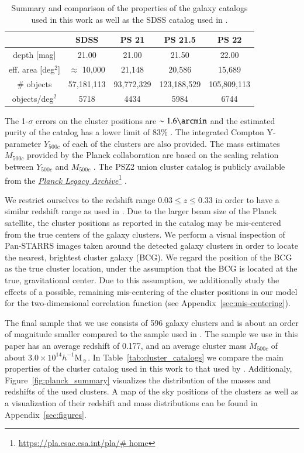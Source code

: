 \documentclass[iop, apjl, twocolappendix, numberedappendix]{emulateapj}
\newcommand\fnurl[2]{%
  \href{#2}{#1}\footnote{\url{#2}}%
}
\begin{document}
\begin{table}
    \centering
    \caption{Summary and comparison of the properties of the galaxy catalogs used in this work as well as the SDSS catalog used in \citet{more2016detection}.}
    \label{tab:galaxy_catalogs}
    \begin{tabular}{ccccc}
    \hline
    & SDSS & PS 21 & PS 21.5 & PS 22 \\
    \hline
    depth [mag] & 21.00 & 21.00 & 21.50 & 22.00\\
    \hline
    eff. area [deg$^2$] & $\approx$ 10,000 & 21,148 & 20,586 & 15,689\\
    \hline
    \# objects & 57,181,113 & 93,772,329 & 123,188,529 & 105,809,113 \\
    \hline
    objects/deg$^2$ & 5718 & 4434 & 5984 & 6744\\
    \hline
    \end{tabular}
\end{table}


The 1-$\sigma$ errors on the cluster positions are $\sim1.6\arcmin$
and the estimated purity of the catalog has a lower limit of 83\%
\citep{ade2016psclusters}. The integrated Compton Y-parameter
$Y_{500c}$ of each of the clusters are also provided. The mass
estimates $M_{500c}$ provided by the Planck collaboration are based on
the scaling relation between $Y_{500c}$ and $M_{500c}$
\citep{ade2014planck,adam2016planck,collaboration2016planck}. The PSZ2
union cluster catalog is publicly available from the
\fnurl{\textit{Planck Legacy Archive}}{https://pla.esac.esa.int/pla/\#
home}.

We restrict ourselves to the redshift range $0.03 \leq z \leq 0.33$ in
order to have a similar redshift range as used in \citet{more2016detection}.
Due to the larger beam size of the Planck
satellite, the cluster positions as reported in the catalog may be
mis-centered from the true centers of the galaxy clusters. We perform
a visual inspection of Pan-STARRS images taken around the detected
galaxy clusters in order to locate the nearest, brightest cluster
galaxy (BCG). We regard the position of the BCG as the true cluster
location, under the assumption that the BCG is located at the true,
gravitational center. Due to this assumption, we additionally
study the effects of a possible, remaining mis-centering of the
cluster positions in our model for the two-dimensional correlation
function (see Appendix~\ref{sec:mis-centering}).

The final sample that we use consists of 596
galaxy clusters and is about an order of magnitude smaller compared
to the sample used in \citet{more2016detection}. The sample we use
in this paper has an average redshift of 0.177, and an average
cluster mass $M_{500c}$ of about $3.0 \times 10^{14}
h^{-1}$M$_{\sun}$. In Table~\ref{tab:cluster_catalogs} we compare
the main properties of the cluster catalog used in this work to that
used by \citet{more2016detection}. Additionaly, Figure~\ref{fig:planck_summary}
visualizes the distribution of the masses and redshifts of the used clusters.
A map of the sky positions of the clusters as well as a visualization of their redshift and mass distributions
can be found in Appendix~\ref{sec:figures}.
\end{document}
